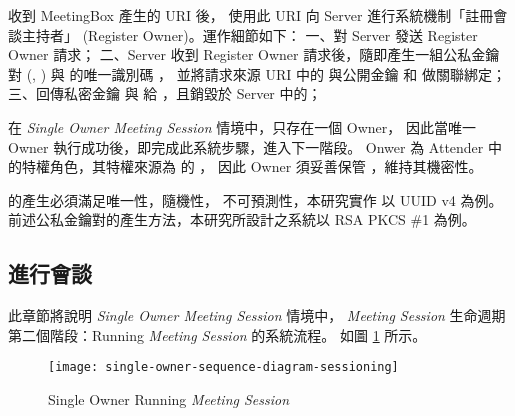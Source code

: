 \begin{steps}
            \DEFowner 收到 MeetingBox 產生的 URI 後，
        使用此 URI 向 Server 進行系統機制「註冊會談主持者」 (Register Owner)。運作細節如下：
        一、\DEFowner 對 Server 發送 Register Owner 請求；
        二、Server 收到 Register Owner 請求後，隨即產生一組公私金鑰對 (\DEFpublicKey, \DEFprivateKey)
        與 \DEFowner 的唯一識別碼 \DEFownerID，
        並將請求來源 URI 中的 \DEFsessionID 與公開金鑰 \DEFpublicKey 和 \DEFownerID 做關聯綁定；
        三、回傳私密金鑰 \DEFprivateKey 與 \DEFownerID 給 \DEFowner，且銷毀於 Server 中的\DEFprivateKey；

            在 {\it Single Owner Meeting Session} 情境中，只存在一個 Owner，
        因此當唯一 Owner 執行成功後，即完成此系統步驟，進入下一階段。
        Onwer 為 Attender 中的特權角色，其特權來源為 \DEFowner 的 \DEFprivateKey，
        因此 Owner 須妥善保管 \DEFprivateKey，維持其機密性。

            \DEFownerID 的產生必須滿足唯一性，隨機性，
        不可預測性，本研究實作 \DEFownerID 以 UUID v4 為例。
        前述公私金鑰對的產生方法，本研究所設計之系統以 RSA PKCS \#1 為例。
\end{steps}

\subsection{進行會談}
\label{subsec:sessioning}

    此章節將說明 {\it Single Owner Meeting Session} 情境中，
{\it Meeting Session} 生命週期第二個階段：Running {\it Meeting Session} 的系統流程。
如圖 \ref{fig:s-o-sessioning} 所示。

\begin{figure}[H]
    \centering
    \texttt{[image: single-owner-sequence-diagram-sessioning]}
    \caption{Single Owner Running {\it Meeting Session}}
    \label{fig:s-o-sessioning}
\end{figure}

